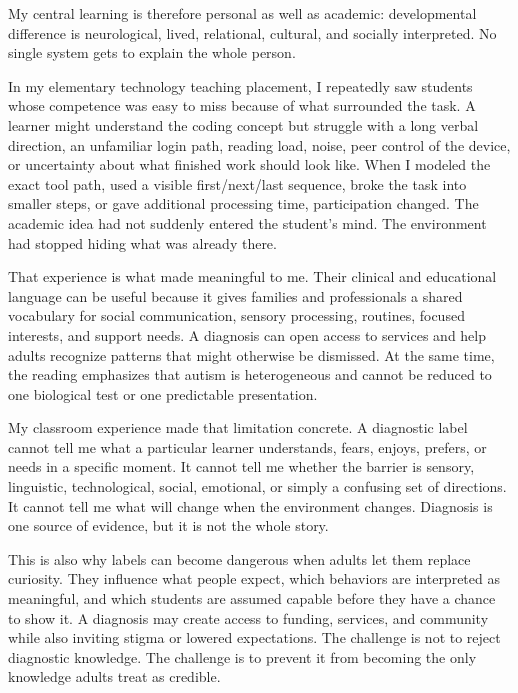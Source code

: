 \documentclass[11pt]{article}
\newcommand{\reviewsection}[1]{\vspace{0.07in}\noindent{\normalsize\bfseries\color{PrimaryRed}#1}\par\vspace{0.02in}}
\begin{document}
My central learning is therefore personal as well as academic: developmental difference is neurological, lived, relational, cultural, and socially interpreted. No single system gets to explain the whole person.

\reviewsection{When a Label Opens a Door---and When It Starts Closing One}

In my elementary technology teaching placement, I repeatedly saw students whose competence was easy to miss because of what surrounded the task. A learner might understand the coding concept but struggle with a long verbal direction, an unfamiliar login path, reading load, noise, peer control of the device, or uncertainty about what finished work should look like. When I modeled the exact tool path, used a visible first/next/last sequence, broke the task into smaller steps, or gave additional processing time, participation changed. The academic idea had not suddenly entered the student's mind. The environment had stopped hiding what was already there.

That experience is what made \citet{cole2023autism} meaningful to me. Their clinical and educational language can be useful because it gives families and professionals a shared vocabulary for social communication, sensory processing, routines, focused interests, and support needs. A diagnosis can open access to services and help adults recognize patterns that might otherwise be dismissed. At the same time, the reading emphasizes that autism is heterogeneous and cannot be reduced to one biological test or one predictable presentation.

My classroom experience made that limitation concrete. A diagnostic label cannot tell me what a particular learner understands, fears, enjoys, prefers, or needs in a specific moment. It cannot tell me whether the barrier is sensory, linguistic, technological, social, emotional, or simply a confusing set of directions. It cannot tell me what will change when the environment changes. Diagnosis is one source of evidence, but it is not the whole story.

This is also why labels can become dangerous when adults let them replace curiosity. They influence what people expect, which behaviors are interpreted as meaningful, and which students are assumed capable before they have a chance to show it. A diagnosis may create access to funding, services, and community while also inviting stigma or lowered expectations. The challenge is not to reject diagnostic knowledge. The challenge is to prevent it from becoming the only knowledge adults treat as credible.
\end{document}
